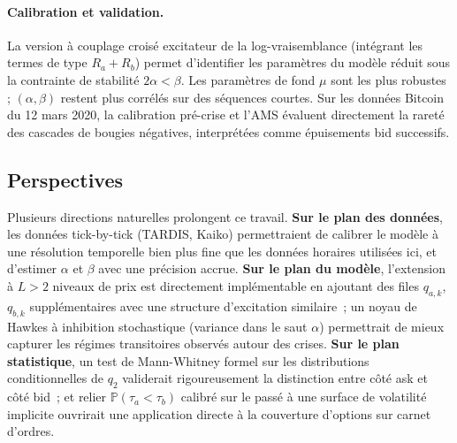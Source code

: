 \documentclass[11pt,a4paper]{article}
\theoremstyle{definition}
\newcommand{\Pb}{\mathbb{P}}
\begin{document}
\paragraph{Calibration et validation.}
La version à couplage croisé excitateur de la log-vraisemblance
(intégrant les termes de type $R_a+R_b$) permet d'identifier les paramètres
du modèle réduit sous la contrainte de stabilité $2\alpha<\beta$. Les paramètres
de fond $\mu$ sont les plus robustes ; $(\alpha,\beta)$ restent plus corrélés
sur des séquences courtes. Sur les données Bitcoin du 12 mars 2020, la
calibration pré-crise et l'AMS évaluent directement la rareté des cascades de
bougies négatives, interprétées comme épuisements bid successifs.

\subsection*{Perspectives}

Plusieurs directions naturelles prolongent ce travail. \textbf{Sur le plan
des données}, les données tick-by-tick (TARDIS, Kaiko) permettraient de
calibrer le modèle à une résolution temporelle bien plus fine que les
données horaires utilisées ici, et d'estimer $\alpha$ et $\beta$ avec une
précision accrue. \textbf{Sur le plan du modèle}, l'extension à $L>2$
niveaux de prix est directement implémentable en ajoutant des files $q_{a,k}$,
$q_{b,k}$ supplémentaires avec une structure d'excitation similaire~; un
noyau de Hawkes à inhibition stochastique (variance dans le saut $\alpha$)
permettrait de mieux capturer les régimes transitoires observés autour des
crises. \textbf{Sur le plan statistique}, un test de Mann-Whitney formel sur
les distributions conditionnelles de $q_2$ validerait rigoureusement la
distinction entre côté ask et côté bid~; et relier $\Pb(\tau_a<\tau_b)$
calibré sur le passé à une surface de volatilité implicite ouvrirait une
application directe à la couverture d'options sur carnet d'ordres.
\end{document}
